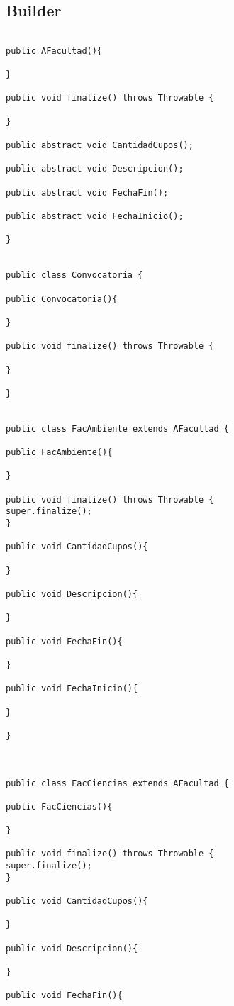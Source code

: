\subsection{Builder}
\begin{lstlisting}

public AFacultad(){

}

public void finalize() throws Throwable {

}

public abstract void CantidadCupos();

public abstract void Descripcion();

public abstract void FechaFin();

public abstract void FechaInicio();

}


public class Convocatoria {

public Convocatoria(){

}

public void finalize() throws Throwable {

}

}


public class FacAmbiente extends AFacultad {

public FacAmbiente(){

}

public void finalize() throws Throwable {
super.finalize();
}

public void CantidadCupos(){

}

public void Descripcion(){

}

public void FechaFin(){

}

public void FechaInicio(){

}

}



public class FacCiencias extends AFacultad {

public FacCiencias(){

}

public void finalize() throws Throwable {
super.finalize();
}

public void CantidadCupos(){

}

public void Descripcion(){

}

public void FechaFin(){


\end{lstlisting}
